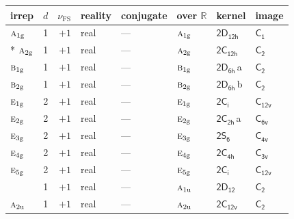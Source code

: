 \documentclass[10pt,a4paper]{article}
\numberwithin{equation}{section}
\newcommand{\grp}[1]{\mathsf{#1}}
\newcommand{\irr}[1]{\text{\normalfont\scshape #1}}
\newcommand{\detbox}[1]{{\setlength{\fboxsep}{1pt}\fbox{#1}}}
\newcommand{\ptag}[1]{\mathrm{#1}}
\newcommand{\clsletter}[1]{\,{\scriptsize\color{black!55}#1}}
\newcommand{\fsind}{\nu_{\mathrm{FS}}}
\begin{document}
\setlength{\emergencystretch}{2em}\par\setlength{\emergencystretch}{0pt}
{\small\renewcommand{\arraystretch}{1.25}\setlength{\tabcolsep}{4pt}\begin{longtable}{@{}lrrlllll@{}}\toprule
irrep & $d$ & $\fsind$ & reality & conjugate & over $\mathbb{R}$ & kernel & image\\\midrule\endhead
\bottomrule\endfoot\endlastfoot
$\irr{a}_{1\ptag{g}}$ & 1 & $+1$ & real & --- & $\irr{a}_{1\ptag{g}}$ & \href{2D12h.pdf}{$\grp{2D_{12h}}$} & \href{../../../rotation/data/pdf/C1.pdf}{$\grp{C_{1}}$}\\*
$\irr{a}_{2\ptag{g}}$ & 1 & $+1$ & real & --- & $\irr{a}_{2\ptag{g}}$ & \href{2C12h.pdf}{$\grp{2C_{12h}}$} & \href{../../../rotation/data/pdf/C2.pdf}{$\grp{C_{2}}$}\\
$\irr{b}_{1\ptag{g}}$ & 1 & $+1$ & real & --- & $\irr{b}_{1\ptag{g}}$ & \href{2D6h.pdf}{$\grp{2D_{6h}}$}\clsletter{a} & \href{../../../rotation/data/pdf/C2.pdf}{$\grp{C_{2}}$}\\
$\irr{b}_{2\ptag{g}}$ & 1 & $+1$ & real & --- & $\irr{b}_{2\ptag{g}}$ & \href{2D6h.pdf}{$\grp{2D_{6h}}$}\clsletter{b} & \href{../../../rotation/data/pdf/C2.pdf}{$\grp{C_{2}}$}\\
$\irr{e}_{1\ptag{g}}$ & 2 & $+1$ & real & --- & $\irr{e}_{1\ptag{g}}$ & \href{2S2.pdf}{$\grp{2C_{i}}$} & \href{../../../rotation/data/pdf/C12v.pdf}{$\grp{C_{12v}}$}\\
$\irr{e}_{2\ptag{g}}$ & 2 & $+1$ & real & --- & $\irr{e}_{2\ptag{g}}$ & \href{2C2h.pdf}{$\grp{2C_{2h}}$}\clsletter{a} & \href{../../../rotation/data/pdf/C6v.pdf}{$\grp{C_{6v}}$}\\
$\irr{e}_{3\ptag{g}}$ & 2 & $+1$ & real & --- & $\irr{e}_{3\ptag{g}}$ & \href{2S6.pdf}{$\grp{2S_{6}}$} & \href{../../../rotation/data/pdf/C4v.pdf}{$\grp{C_{4v}}$}\\
$\irr{e}_{4\ptag{g}}$ & 2 & $+1$ & real & --- & $\irr{e}_{4\ptag{g}}$ & \href{2C4h.pdf}{$\grp{2C_{4h}}$} & \href{../../../rotation/data/pdf/C3v.pdf}{$\grp{C_{3v}}$}\\
$\irr{e}_{5\ptag{g}}$ & 2 & $+1$ & real & --- & $\irr{e}_{5\ptag{g}}$ & \href{2S2.pdf}{$\grp{2C_{i}}$} & \href{../../../rotation/data/pdf/C12v.pdf}{$\grp{C_{12v}}$}\\
\detbox{$\irr{a}_{1\ptag{u}}$} & 1 & $+1$ & real & --- & $\irr{a}_{1\ptag{u}}$ & \href{2D12.pdf}{$\grp{2D_{12}}$} & \href{../../../rotation/data/pdf/C2.pdf}{$\grp{C_{2}}$}\\
$\irr{a}_{2\ptag{u}}$ & 1 & $+1$ & real & --- & $\irr{a}_{2\ptag{u}}$ & \href{2C12v.pdf}{$\grp{2C_{12v}}$} & \href{../../../rotation/data/pdf/C2.pdf}{$\grp{C_{2}}$}\\

\end{longtable}}
\end{document}
